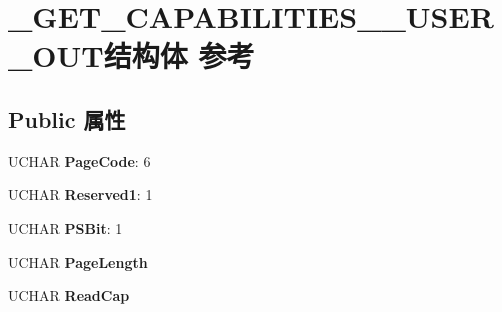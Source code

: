 \hypertarget{struct___g_e_t___c_a_p_a_b_i_l_i_t_i_e_s__3___u_s_e_r___o_u_t}{}\section{\+\_\+\+G\+E\+T\+\_\+\+C\+A\+P\+A\+B\+I\+L\+I\+T\+I\+E\+S\+\_\+\_\+\+U\+S\+E\+R\+\_\+\+O\+U\+T结构体 参考}
\label{struct___g_e_t___c_a_p_a_b_i_l_i_t_i_e_s__3___u_s_e_r___o_u_t}
\subsection*{Public 属性}
\begin{DoxyCompactItemize}
\item 
\mbox{\label{struct___g_e_t___c_a_p_a_b_i_l_i_t_i_e_s__3___u_s_e_r___o_u_t_a9db3d907730850a667e24efffdce12fa}} 
U\+C\+H\+AR {\bfseries Page\+Code}\+: 6
\item 
\mbox{\label{struct___g_e_t___c_a_p_a_b_i_l_i_t_i_e_s__3___u_s_e_r___o_u_t_a928fcdbe9eef336275b7f6c0327aab24}} 
U\+C\+H\+AR {\bfseries Reserved1}\+: 1
\item 
\mbox{\label{struct___g_e_t___c_a_p_a_b_i_l_i_t_i_e_s__3___u_s_e_r___o_u_t_ac599a0d967be2e7268cc5e78d4295224}} 
U\+C\+H\+AR {\bfseries P\+S\+Bit}\+: 1
\item 
\mbox{\label{struct___g_e_t___c_a_p_a_b_i_l_i_t_i_e_s__3___u_s_e_r___o_u_t_a2529eae83c1f91f416d7af3ea7997bc6}} 
U\+C\+H\+AR {\bfseries Page\+Length}
\item 
\mbox{\label{struct___g_e_t___c_a_p_a_b_i_l_i_t_i_e_s__3___u_s_e_r___o_u_t_a916bbc50c9acfc6c75fecb07e4f93730}} 
U\+C\+H\+AR {\bfseries Read\+Cap}
\item 
\mbox{\label{struct___g_e_t___c_a_p_a_b_i_l_i_t_i_e_s__3___u_s_e_r___o_u_t_a1473bf893895c180de8b44efcf1466d5}} 

\end{DoxyCompactItemize}
